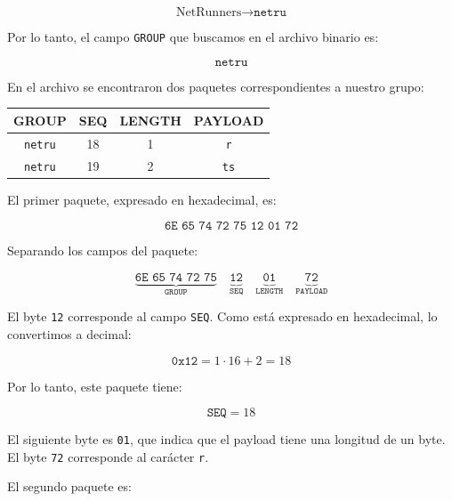 \documentclass[11pt,a4paper]{article}
\begin{document}
\begin{enumerate}[label=\arabic*)]
\begin{enumerate}[label=\alph*)]
          \[
            \text{NetRunners} \rightarrow \texttt{netru}
          \]

          Por lo tanto, el campo \texttt{GROUP} que buscamos en el archivo
          binario es:

          \[
            \boxed{\texttt{netru}}
          \]

          En el archivo se encontraron dos paquetes correspondientes a nuestro
          grupo:

          \begin{center}

            \begin{tabular}{|c|c|c|c|}
              \hline
              GROUP & SEQ & LENGTH & PAYLOAD \\
              \hline
              \texttt{netru} & 18 & 1 & \texttt{r} \\
              \hline
              \texttt{netru} & 19 & 2 & \texttt{ts} \\
              \hline
            \end{tabular}

          \end{center}

          El primer paquete, expresado en hexadecimal, es:

          \[
            \texttt{6E\ 65\ 74\ 72\ 75\ 12\ 01\ 72}
          \]

          Separando los campos del paquete:

          \[
            \underbrace{\texttt{6E\ 65\ 74\ 72\ 75}}_{\texttt{GROUP}}
            \quad
            \underbrace{\texttt{12}}_{\texttt{SEQ}}
            \quad
            \underbrace{\texttt{01}}_{\texttt{LENGTH}}
            \quad
            \underbrace{\texttt{72}}_{\texttt{PAYLOAD}}
          \]

          El byte \texttt{12} corresponde al campo \texttt{SEQ}. Como está
          expresado en hexadecimal, lo convertimos a decimal:

          \[
            \texttt{0x12}=1\cdot16+2=18
          \]

          Por lo tanto, este paquete tiene:

          \[
            \texttt{SEQ}=18
          \]

          El siguiente byte es \texttt{01}, que indica que el payload tiene una
          longitud de un byte. El byte \texttt{72} corresponde al carácter
          \texttt{r}.

          El segundo paquete es:


\end{enumerate}
\end{enumerate}
\end{document}
